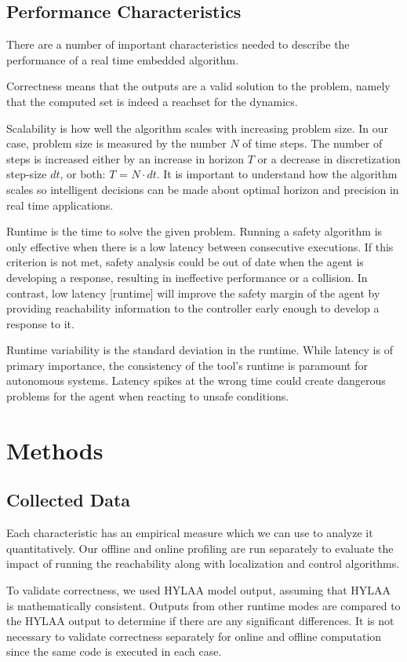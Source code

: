 \documentclass[runningheads]{llncs}
\begin{document}
\subsection{Performance Characteristics}
There are a number of important characteristics needed to describe the performance of a real time embedded algorithm.

Correctness means that the outputs are a valid solution to the problem, namely that the computed set is indeed a reachset for the dynamics.

Scalability is how well the algorithm scales with increasing problem size. In our case, problem size is measured by the number $N$ of time steps. The number of steps is increased either by an increase in horizon $T$ or a decrease in discretization step-size $dt$, or both: $T$ = $N\cdot dt$. It is important to understand how the algorithm scales so intelligent decisions can be made about optimal horizon and precision in real time applications.

Runtime is the time to solve the given problem. 
Running a safety algorithm is only effective when there is a low latency between consecutive executions. If this criterion is not met, safety analysis could be out of date when the agent is developing a response, resulting in ineffective performance or a collision. 
In contrast, low latency [runtime] will improve the safety margin of the agent by providing reachability information to the controller early enough to develop a response to it.

Runtime variability is the standard deviation in the runtime. While latency is of primary importance, the consistency of the tool's runtime is paramount for autonomous systems. 
Latency spikes at the wrong time could create dangerous problems for the agent when reacting to unsafe conditions. 

\section{Methods}
\subsection{Collected Data}
Each characteristic has an empirical measure which we can use to analyze it quantitatively. Our offline and online profiling are run separately to evaluate the impact of running the reachability along with localization and control algorithms.

To validate correctness, we used HYLAA model output, assuming that HYLAA is mathematically consistent. Outputs from other runtime modes are compared to the HYLAA output to determine if there are any significant differences. It is not necessary to validate correctness separately for online and offline computation since the same code is executed in each case.
\end{document}
